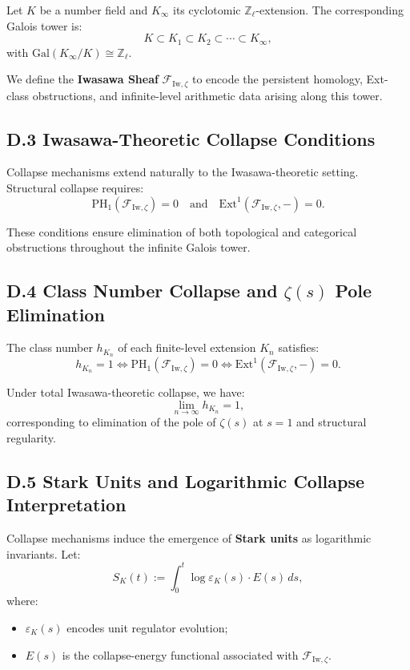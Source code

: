 \documentclass[11pt]{article}
\begin{document}
Let $K$ be a number field and $K_\infty$ its cyclotomic $\mathbb{Z}_\ell$-extension. The corresponding Galois tower is:
\[
K \subset K_1 \subset K_2 \subset \cdots \subset K_\infty,
\]
with $\mathrm{Gal}(K_\infty/K) \cong \mathbb{Z}_\ell$.

We define the \textbf{Iwasawa Sheaf} $\mathcal{F}_{\mathrm{Iw}, \zeta}$ to encode the persistent homology, Ext-class obstructions, and infinite-level arithmetic data arising along this tower.

\subsection*{D.3 Iwasawa-Theoretic Collapse Conditions}

Collapse mechanisms extend naturally to the Iwasawa-theoretic setting. Structural collapse requires:
\[
\mathrm{PH}_1(\mathcal{F}_{\mathrm{Iw}, \zeta}) = 0 \quad \text{and} \quad \mathrm{Ext}^1(\mathcal{F}_{\mathrm{Iw}, \zeta}, -) = 0.
\]

These conditions ensure elimination of both topological and categorical obstructions throughout the infinite Galois tower.

\subsection*{D.4 Class Number Collapse and $\zeta(s)$ Pole Elimination}

The class number $h_{K_n}$ of each finite-level extension $K_n$ satisfies:
\[
h_{K_n} = 1 \iff \mathrm{PH}_1(\mathcal{F}_{\mathrm{Iw}, \zeta}) = 0 \iff \mathrm{Ext}^1(\mathcal{F}_{\mathrm{Iw}, \zeta}, -) = 0.
\]

Under total Iwasawa-theoretic collapse, we have:
\[
\lim_{n \to \infty} h_{K_n} = 1,
\]
corresponding to elimination of the pole of $\zeta(s)$ at $s = 1$ and structural regularity.

\subsection*{D.5 Stark Units and Logarithmic Collapse Interpretation}

Collapse mechanisms induce the emergence of \textbf{Stark units} as logarithmic invariants. Let:
\[
S_K(t) := \int_0^t \log \varepsilon_K(s) \cdot E(s) \, ds,
\]
where:
\begin{itemize}
    \item $\varepsilon_K(s)$ encodes unit regulator evolution;
    \item $E(s)$ is the collapse-energy functional associated with $\mathcal{F}_{\mathrm{Iw}, \zeta}$.
\end{itemize}
\end{document}

